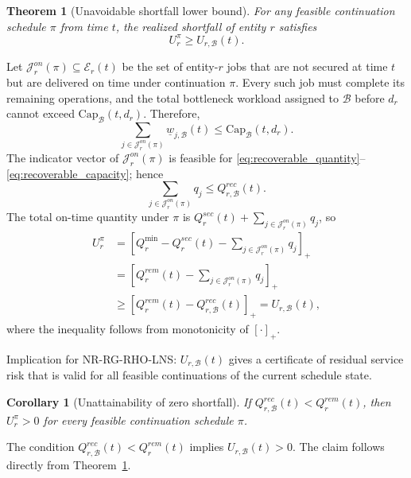 \documentclass[a4paper,fleqn]{cas-sc}
\newtheorem{theorem}{Theorem}
\newtheorem{corollary}{Corollary}
\begin{document}
\begin{theorem}[Unavoidable shortfall lower bound]
\label{thm:unavoidable_shortfall}
For any feasible continuation schedule \(\pi\) from time \(t\), the realized shortfall of entity \(r\) satisfies
\begin{equation}
U_r^\pi\ge U_{r,\mathcal B}(t).
\label{eq:shortfall_bound}
\end{equation}
\end{theorem}

\begin{pf}
Let \(\mathcal J_r^{on}(\pi)\subseteq\mathcal E_r(t)\) be the set of entity-\(r\) jobs that are not secured at time \(t\) but are delivered on time under continuation \(\pi\). Every such job must complete its remaining operations, and the total bottleneck workload assigned to \(\mathcal B\) before \(d_r\) cannot exceed \(\mathrm{Cap}_{\mathcal B}(t,d_r)\). Therefore,
\[
\sum_{j\in\mathcal J_r^{on}(\pi)}
\underline w_{j,\mathcal B}(t)
\le
\mathrm{Cap}_{\mathcal B}(t,d_r).
\]
The indicator vector of \(\mathcal J_r^{on}(\pi)\) is feasible for \eqref{eq:recoverable_quantity}--\eqref{eq:recoverable_capacity}; hence
\[
\sum_{j\in\mathcal J_r^{on}(\pi)}q_j
\le
Q_{r,\mathcal B}^{rec}(t).
\]
The total on-time quantity under \(\pi\) is \(Q_r^{sec}(t)+\sum_{j\in\mathcal J_r^{on}(\pi)}q_j\), so
\begin{align}
U_r^\pi
&=
\left[
Q_r^{\min}
-Q_r^{sec}(t)
-\sum_{j\in\mathcal J_r^{on}(\pi)}q_j
\right]_+
\nonumber\\
&=
\left[
Q_r^{rem}(t)
-\sum_{j\in\mathcal J_r^{on}(\pi)}q_j
\right]_+
\nonumber\\
&\ge
[Q_r^{rem}(t)-Q_{r,\mathcal B}^{rec}(t)]_+
=U_{r,\mathcal B}(t),
\nonumber
\end{align}
where the inequality follows from monotonicity of \([\cdot]_+\).
\end{pf}

Implication for NR-RG-RHO-LNS: \(U_{r,\mathcal B}(t)\) gives a certificate of residual service risk that is valid for all feasible continuations of the current schedule state.

\begin{corollary}[Unattainability of zero shortfall]
\label{cor:unattainable}
If \(Q_{r,\mathcal B}^{rec}(t)<Q_r^{rem}(t)\), then \(U_r^\pi>0\) for every feasible continuation schedule \(\pi\).
\end{corollary}

\begin{pf}
The condition \(Q_{r,\mathcal B}^{rec}(t)<Q_r^{rem}(t)\) implies \(U_{r,\mathcal B}(t)>0\). The claim follows directly from Theorem~\ref{thm:unavoidable_shortfall}.
\end{pf}
\end{document}
